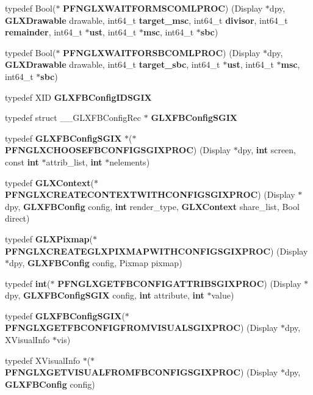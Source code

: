 \begin{DoxyCompactItemize}
typedef Bool($\ast$ {\bf P\+F\+N\+G\+L\+X\+W\+A\+I\+T\+F\+O\+R\+M\+S\+C\+O\+M\+L\+P\+R\+OC}) (Display $\ast$dpy, {\bf G\+L\+X\+Drawable} drawable, int64\+\_\+t {\bf target\+\_\+msc}, int64\+\_\+t {\bf divisor}, int64\+\_\+t {\bf remainder}, int64\+\_\+t $\ast${\bf ust}, int64\+\_\+t $\ast${\bf msc}, int64\+\_\+t $\ast${\bf sbc})
\item 
typedef Bool($\ast$ {\bf P\+F\+N\+G\+L\+X\+W\+A\+I\+T\+F\+O\+R\+S\+B\+C\+O\+M\+L\+P\+R\+OC}) (Display $\ast$dpy, {\bf G\+L\+X\+Drawable} drawable, int64\+\_\+t {\bf target\+\_\+sbc}, int64\+\_\+t $\ast${\bf ust}, int64\+\_\+t $\ast${\bf msc}, int64\+\_\+t $\ast${\bf sbc})
\item 
typedef X\+ID {\bf G\+L\+X\+F\+B\+Config\+I\+D\+S\+G\+IX}
\item 
typedef struct \+\_\+\+\_\+\+G\+L\+X\+F\+B\+Config\+Rec $\ast$ {\bf G\+L\+X\+F\+B\+Config\+S\+G\+IX}
\item 
typedef {\bf G\+L\+X\+F\+B\+Config\+S\+G\+IX} $\ast$($\ast$ {\bf P\+F\+N\+G\+L\+X\+C\+H\+O\+O\+S\+E\+F\+B\+C\+O\+N\+F\+I\+G\+S\+G\+I\+X\+P\+R\+OC}) (Display $\ast$dpy, {\bf int} screen, const {\bf int} $\ast$attrib\+\_\+list, {\bf int} $\ast$nelements)
\item 
typedef {\bf G\+L\+X\+Context}($\ast$ {\bf P\+F\+N\+G\+L\+X\+C\+R\+E\+A\+T\+E\+C\+O\+N\+T\+E\+X\+T\+W\+I\+T\+H\+C\+O\+N\+F\+I\+G\+S\+G\+I\+X\+P\+R\+OC}) (Display $\ast$dpy, {\bf G\+L\+X\+F\+B\+Config} config, {\bf int} render\+\_\+type, {\bf G\+L\+X\+Context} share\+\_\+list, Bool direct)
\item 
typedef {\bf G\+L\+X\+Pixmap}($\ast$ {\bf P\+F\+N\+G\+L\+X\+C\+R\+E\+A\+T\+E\+G\+L\+X\+P\+I\+X\+M\+A\+P\+W\+I\+T\+H\+C\+O\+N\+F\+I\+G\+S\+G\+I\+X\+P\+R\+OC}) (Display $\ast$dpy, {\bf G\+L\+X\+F\+B\+Config} config, Pixmap pixmap)
\item 
typedef {\bf int}($\ast$ {\bf P\+F\+N\+G\+L\+X\+G\+E\+T\+F\+B\+C\+O\+N\+F\+I\+G\+A\+T\+T\+R\+I\+B\+S\+G\+I\+X\+P\+R\+OC}) (Display $\ast$dpy, {\bf G\+L\+X\+F\+B\+Config\+S\+G\+IX} config, {\bf int} attribute, {\bf int} $\ast$value)
\item 
typedef {\bf G\+L\+X\+F\+B\+Config\+S\+G\+IX}($\ast$ {\bf P\+F\+N\+G\+L\+X\+G\+E\+T\+F\+B\+C\+O\+N\+F\+I\+G\+F\+R\+O\+M\+V\+I\+S\+U\+A\+L\+S\+G\+I\+X\+P\+R\+OC}) (Display $\ast$dpy, X\+Visual\+Info $\ast$vis)
\item 
typedef X\+Visual\+Info $\ast$($\ast$ {\bf P\+F\+N\+G\+L\+X\+G\+E\+T\+V\+I\+S\+U\+A\+L\+F\+R\+O\+M\+F\+B\+C\+O\+N\+F\+I\+G\+S\+G\+I\+X\+P\+R\+OC}) (Display $\ast$dpy, {\bf G\+L\+X\+F\+B\+Config} config)

\end{DoxyCompactItemize}
